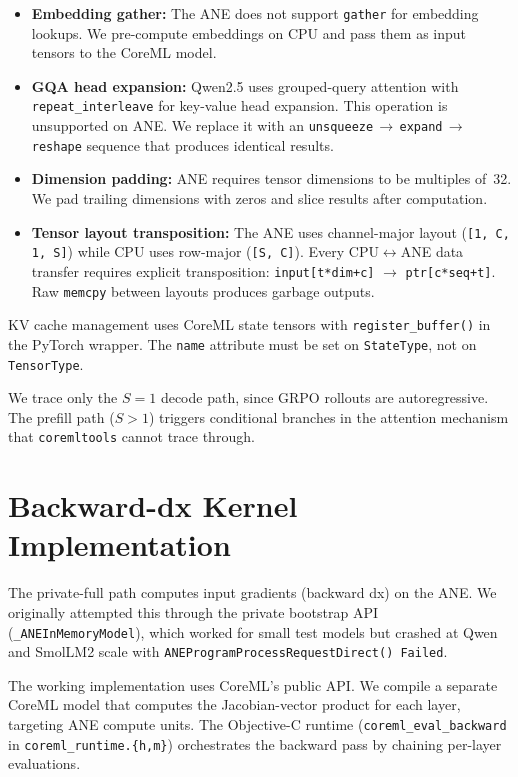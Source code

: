 \documentclass[11pt]{article}
\begin{document}
\begin{itemize}[leftmargin=*]
\item \textbf{Embedding gather:}  The ANE does not support \texttt{gather} for embedding lookups.  We pre-compute embeddings on CPU and pass them as input tensors to the CoreML model.

\item \textbf{GQA head expansion:}  Qwen2.5 uses grouped-query attention with \texttt{repeat\_interleave} for key-value head expansion.  This operation is unsupported on ANE.  We replace it with an \texttt{unsqueeze}$\,\to\,$\texttt{expand}$\,\to\,$\texttt{reshape} sequence that produces identical results.

\item \textbf{Dimension padding:}  ANE requires tensor dimensions to be multiples of~32.  We pad trailing dimensions with zeros and slice results after computation.

\item \textbf{Tensor layout transposition:}  The ANE uses channel-major layout (\texttt{[1, C, 1, S]}) while CPU uses row-major (\texttt{[S, C]}).  Every CPU$\leftrightarrow$ANE data transfer requires explicit transposition: \texttt{input[t*dim+c]} $\to$ \texttt{ptr[c*seq+t]}.  Raw \texttt{memcpy} between layouts produces garbage outputs.
\end{itemize}

KV cache management uses CoreML state tensors with \texttt{register\_buffer()} in the PyTorch wrapper.  The \texttt{name} attribute must be set on \texttt{StateType}, not on \texttt{TensorType}.

We trace only the $S=1$ decode path, since GRPO rollouts are autoregressive.  The prefill path ($S>1$) triggers conditional branches in the attention mechanism that \texttt{coremltools} cannot trace through.

\section{Backward-dx Kernel Implementation}
\label{app:backward}

The private-full path computes input gradients (backward dx) on the ANE.  We originally attempted this through the private bootstrap API (\texttt{\_ANEInMemoryModel}), which worked for small test models but crashed at Qwen and SmolLM2 scale with \texttt{ANEProgramProcessRequestDirect() Failed}.

The working implementation uses CoreML's public API.  We compile a separate CoreML model that computes the Jacobian-vector product for each layer, targeting ANE compute units.  The Objective-C runtime (\texttt{coreml\_eval\_backward} in \texttt{coreml\_runtime.\{h,m\}}) orchestrates the backward pass by chaining per-layer evaluations.



\end{document}
